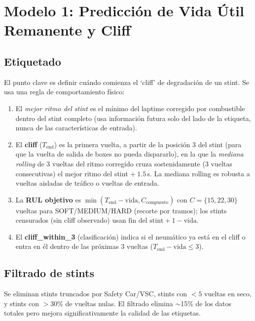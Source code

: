 \documentclass[conference]{IEEEtran}
\begin{document}
\section{Modelo 1: Predicción de Vida Útil Remanente y Cliff}

\subsection{Etiquetado}

El punto clave es definir cuándo comienza el `cliff' de degradación de un
stint. Se usa una regla de comportamiento físico:

\begin{enumerate}
  \item El \emph{mejor ritmo del stint} es el mínimo del laptime corregido
        por combustible dentro del stint completo (usa información futura
        solo del lado de la etiqueta, nunca de las características de
        entrada).
  \item El \textbf{cliff} ($T_{\text{end}}$) es la primera vuelta, a partir
        de la posición 3 del stint (para que la vuelta de salida de boxes
        no pueda dispararlo), en la que la \emph{mediana rolling} de 3
        vueltas del ritmo corregido cruza sostenidamente (3 vueltas
        consecutivas) el mejor ritmo del stint $+\ 1.5$\,s. La mediana
        rolling es robusta a vueltas aisladas de tráfico o vueltas de
        entrada.
  \item La \textbf{RUL objetivo} es
        $\min(T_{\text{end}} - \text{vida}, C_{\text{compuesto}})$ con
        $C = \{15, 22, 30\}$ vueltas para SOFT/MEDIUM/HARD (recorte por
        tramos); los stints censurados (sin cliff observado) usan
        $\text{fin del stint} + 1 - \text{vida}$.
  \item El \textbf{cliff\_within\_3} (clasificación) indica si el neumático
        ya está en el cliff o entra en él dentro de las próximas 3 vueltas
        ($T_{\text{end}} - \text{vida} \le 3$).
\end{enumerate}

\subsection{Filtrado de stints}

Se eliminan stints truncados por Safety Car/VSC, stints con $<5$ vueltas
en seco, y stints con $>30\%$ de vueltas nulas. El filtrado elimina
$\sim$15\% de los datos totales pero mejora significativamente la calidad
de las etiquetas.
\end{document}
